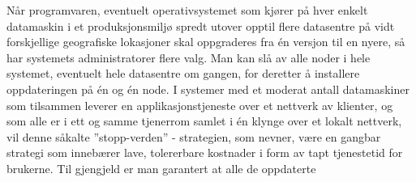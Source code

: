 Når programvaren, eventuelt operativsystemet som kjører på hver enkelt datamaskin i et produksjonsmiljø spredt utover opptil flere datasentre på vidt forskjellige geografiske lokasjoner skal oppgraderes fra én versjon til en nyere, så har systemets administratorer flere valg. Man kan slå av alle noder i hele systemet, eventuelt hele datasentre om gangen, for deretter å installere oppdateringen på én og én node. I systemer med et moderat antall datamaskiner som tilsammen leverer en applikasjonstjeneste over et nettverk av klienter, og som alle er i ett og samme tjenerrom samlet i én klynge over et lokalt nettverk, vil denne såkalte ''stopp-verden'' - strategien, som \cite{saur2016} nevner, være en gangbar strategi som innebærer lave, tolererbare kostnader i form av tapt tjenestetid for brukerne. Til gjengjeld er man garantert at alle de oppdaterte 


